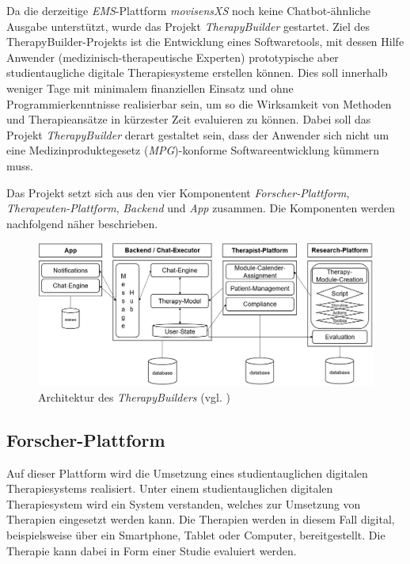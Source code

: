 Da die derzeitige \emph{EMS}-Plattform \emph{movisensXS} noch keine Chatbot-ähnliche Ausgabe unterstützt, wurde das Projekt \emph{TherapyBuilder} gestartet. Ziel des TherapyBuilder-Projekts ist die Entwicklung eines Softwaretools, mit dessen Hilfe Anwender (medizinisch-therapeutische Experten) prototypische aber studientaugliche digitale Therapiesysteme erstellen können. Dies soll innerhalb weniger Tage mit minimalem finanziellen Einsatz und ohne Programmierkenntnisse realisierbar sein, um so die Wirksamkeit von Methoden und Therapieansätze in kürzester Zeit evaluieren zu können. Dabei soll das Projekt \emph{TherapyBuilder} derart gestaltet sein, dass der Anwender sich nicht um eine Medizinproduktegesetz (\emph{MPG})-konforme Softwareentwicklung kümmern muss. 

Das Projekt setzt sich aus den vier Komponentent \emph{Forscher-Plattform}, \emph{Therapeuten-Plattform}, \emph{Backend} und \emph{App} zusammen. Die Komponenten werden nachfolgend näher beschrieben.

\begin{figure}[h]
\centering
\includegraphics[width=1\textwidth]{pictures/TherapyBuilder}
\caption{Architektur des \emph{TherapyBuilders} (vgl. \citep{benjaminhoff})}
\label{therapyBuilder}
\end{figure}


\subsection{Forscher-Plattform}

Auf dieser Plattform wird die Umsetzung eines studientauglichen digitalen Therapiesystems realisiert. Unter einem studientauglichen digitalen Therapiesystem wird ein System verstanden, welches zur Umsetzung von Therapien eingesetzt werden kann. Die Therapien werden in diesem Fall digital, beispielsweise über ein Smartphone, Tablet oder Computer, bereitgestellt. Die Therapie kann dabei in Form einer Studie evaluiert werden.

